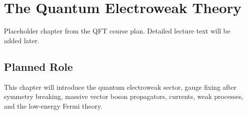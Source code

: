 \chapter{The Quantum Electroweak Theory}

\begin{remarkbox}
Placeholder chapter from the QFT course plan. Detailed lecture text will be added later.
\end{remarkbox}

\section{Planned Role}

This chapter will introduce the quantum electroweak sector, gauge fixing after symmetry breaking, massive vector boson propagators, currents, weak processes, and the low-energy Fermi theory.

